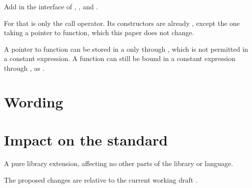 \documentclass[a4paper,10pt,oneside,openany,final,article]{memoir}
\begin{document}
Add  in the interface of , , and .

For  that is only the call operator. Its constructors are already , except the one taking a pointer to function, which this paper does not change.

A pointer to function can be stored in a  only through , which is not permitted in a constant expression. A function can still be bound in a constant expression through , as .

\chapter{Wording}

\begin{wording}



\end{wording}

\chapter{Impact on the standard}

A pure library extension, affecting no other parts of the library or language.

The proposed changes are relative to the current working draft \cite{N5054}.

\renewcommand{\bibname}{References}




\backmatter
\end{document}

